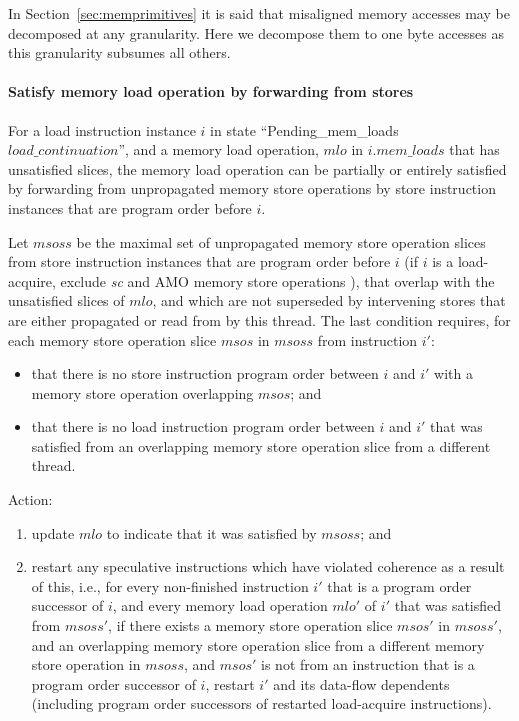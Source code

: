 \begin{commentary}
In Section~\ref{sec:memprimitives} it is said that misaligned memory accesses may be decomposed at any granularity.
Here we decompose them to one byte accesses as this granularity subsumes all others.
\end{commentary}

\paragraph{Satisfy memory load operation by forwarding from stores}\label{omm:thread:sat_by_forwarding}
For a load instruction instance $i$ in state ``{\sc Pending\_mem\_loads} $load\_continuation$'', and a memory load operation, $mlo$ in $i.mem\_loads$ that has unsatisfied slices, the memory load operation can be partially or entirely satisfied by forwarding from unpropagated memory store operations by store instruction instances that are program order before $i$.

Let $msoss$ be the maximal set of unpropagated memory store operation slices from store instruction instances that are program order before $i$ (if $i$ is a load-acquire, exclude {\em sc} and AMO memory store operations ), that overlap with the unsatisfied slices of $mlo$, and which are not superseded by intervening stores that are either propagated or read from by this thread.
The last condition requires, for each memory store operation slice $msos$ in $msoss$ from instruction $i'$:
\begin{itemize}
\item that there is no store instruction program order between $i$ and $i'$ with a memory store operation overlapping $msos$; and
\item that there is no load instruction program order between $i$ and $i'$ that was satisfied from an overlapping memory store operation slice from a different thread.
\end{itemize}
Action:
\begin{enumerate}
\item update $mlo$ to indicate that it was satisfied by $msoss$; and
\item restart any speculative instructions which have violated coherence as a result of this, i.e., for every non-finished instruction $i'$ that is a program order successor of $i$, and every memory load operation $mlo'$ of $i'$ that was satisfied from $msoss'$, if there exists a memory store operation slice $msos'$ in $msoss'$, and an overlapping memory store operation slice from a different memory store operation in $msoss$, and $msos'$ is not from an instruction that is a program order successor of $i$, restart $i'$ and its data-flow dependents (including program order successors of restarted load-acquire instructions).
\end{enumerate}

